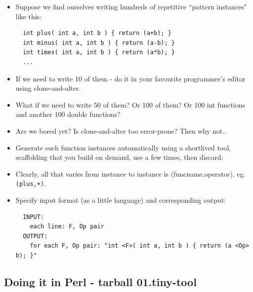 \documentclass[handout,]{beamer}
\newcommand{\pitem}{\pause \item}
\begin{document}
\begin{frame}[fragile]
    \begin{itemize}
    \item
    Suppose we find ourselves writing hundreds of repetitive ``pattern instances" like this:

\tiny
\begin{verbatim}
  int plus( int a, int b ) { return (a+b); }
  int minus( int a, int b ) { return (a-b); }
  int times( int a, int b ) { return (a*b); }
  ...
\end{verbatim}
\small

   \pitem
     If we need to write 10 of them - do it in your favourite \alert{programmer's editor} using clone-and-alter.

   \pitem
     What if we need to write 50 of them?  Or 100 of them?  Or 100 int functions and another 100 double functions?

   \pitem
     Are we bored yet?  Is clone-and-alter too error-prone? Then why not..

   \pitem
     Generate such function instances automatically using a
     \alert{shortlived tool},
     scaffolding that you \alert{build} on demand,
     \alert{use} a few times, then \alert{discard}:

   \pitem
     Clearly, all that varies from instance to instance is
     (funcname,operator), eg. \verb!(plus,+)!.

    \pitem
      Specify input format (as a \alert{little language}) and corresponding
      output:

\tiny
\begin{verbatim}
  INPUT:
    each line: F, Op pair
  OUTPUT:
    for each F, Op pair: "int <F>( int a, int b ) { return (a <Op> b); }"
\end{verbatim}
\small

    \end{itemize}
\end{frame}

\subsection{Doing it in Perl - tarball 01.tiny-tool}
\end{document}
